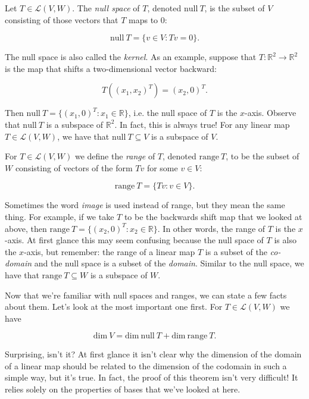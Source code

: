 \documentclass[12pt]{article}
\begin{document}
Let $T \in \mathcal{L} (V, W)$. The \textit{null space} of $T$, denoted $\textrm{null} \: T$, is the subset of $V$ consisting of those vectors that $T$ maps to 0:

$$\textrm{null} \: T = \{ v \in V : Tv = 0 \}.$$

The null space is also called the \textit{kernel}. As an example, suppose that $T : \mathbb{R}^2 \rightarrow \mathbb{R}^2$ is the map that shifts a two-dimensional vector backward:

$$T( (x_1, x_2)^T ) = (x_2, 0)^T.$$

Then $\textrm{null} \: T = \{ (x_1, 0)^T : x_1 \in \mathbb{R} \}$, i.e. the null space of $T$ is the $x$-axis. Observe that $\textrm{null} \: T$ is a subspace of $\mathbb{R}^2$. In fact, this is always true! For any linear map $T \in \mathcal{L} (V, W)$, we have that $\textrm{null} \: T \subseteq V$ is a subspace of $V$.

\vskip 3mm

For $T \in \mathcal{L} (V, W)$ we define the \textit{range} of $T$, denoted $\textrm{range} \: T$, to be the subset of $W$ consisting of vectors of the form $Tv$ for some $v \in V$:

$$\textrm{range} \: T = \{ Tv : v \in V \}.$$

Sometimes the word \textit{image} is used instead of range, but they mean the same thing. For example, if we take $T$ to be the backwards shift map that we looked at above, then
$\textrm{range} \: T = \{ (x_2, 0)^T : x_2 \in \mathbb{R} \}.$
In other words, the range of $T$ is the $x$-axis. At first glance this may seem confusing because the null space of $T$ is also the $x$-axis, but remember:  the range of a linear map $T$ is a subset of the \textit{co-domain} and the null space is a subset of the \textit{domain}. Similar to the null space, we have that $\textrm{range} \: T \subseteq W$ is a subspace of $W$.

\vskip 4mm
Now that we're familiar with null spaces and ranges, we can state a few facts about them. Let's look at the most important one first. For $T \in \mathcal{L} (V, W)$ we have

$$\textrm{dim} \: V = \textrm{dim} \: \textrm{null} \: T + \textrm{dim} \: \textrm{range} \: T.$$

Surprising, isn't it? At first glance it isn't clear why the dimension of the domain of a linear map should be related to the dimension of the codomain in such a simple way, but it's true. In fact, the proof of this theorem isn't very difficult! It relies solely on the properties of bases that we've looked at here. 
\end{document}
